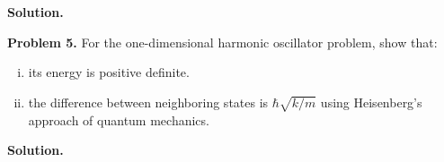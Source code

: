 \documentclass[letterpaper]{article}
\begin{document}
\textbf{Solution.}
\hr

\textbf{Problem 5.} For the one-dimensional harmonic oscillator problem, show that:
\begin{enumerate}[(i)]
     \item its energy is positive definite.
     \item the difference between neighboring states is $\hbar\sqrt{k/m}$ using Heisenberg's approach of quantum mechanics.
 \end{enumerate} 

 \textbf{Solution.}
\end{document}
